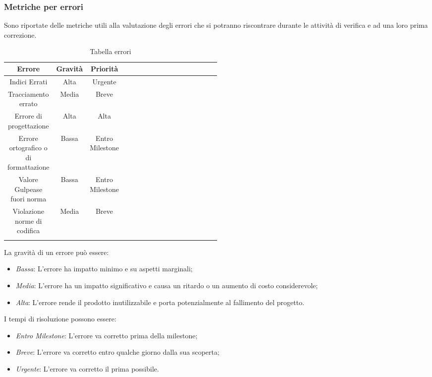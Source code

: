 \subsubsection{Metriche per errori}
Sono riportate delle metriche utili alla valutazione degli errori che si potranno riscontrare durante le attività di verifica e ad una loro prima correzione.
\begin{center}
\begin{longtable}{|c|c|c|p{0.5\linewidth}|}
\toprule
\textbf{Errore} & \textbf{Gravità} & \textbf{Priorità} \\

\midrule
Indici Errati & Alta & Urgente\\
\midrule
Tracciamento errato & Media & Breve\\
\midrule
Errore di progettazione & Alta & Alta\\
\midrule
Errore ortografico o di formattazione & Bassa & Entro Milestone\\
\midrule
Valore Gulpease fuori norma & Bassa & Entro Milestone\\
\midrule
Violazione norme di codifica & Media & Breve\\

\bottomrule
\caption{Tabella errori}
\label{tab:changelog}
\end{longtable}
\end{center}

La gravità di un errore può essere:

\begin{itemize}
\item \emph{Bassa}: L'errore ha impatto minimo e su aspetti marginali;
\item \emph{Media}: L'errore ha un impatto significativo e causa un ritardo o un aumento di costo considerevole;
\item \emph{Alta}: L'errore rende il prodotto inutilizzabile e porta potenzialmente al fallimento del progetto.
\end{itemize}

I tempi di risoluzione possono essere:
\begin{itemize}
\item \emph{Entro Milestone}: L'errore va corretto prima della milestone;
\item \emph{Breve}: L'errore va corretto entro qualche giorno dalla sua scoperta;
\item \emph{Urgente}: L'errore va corretto il prima possibile.
\end{itemize}

